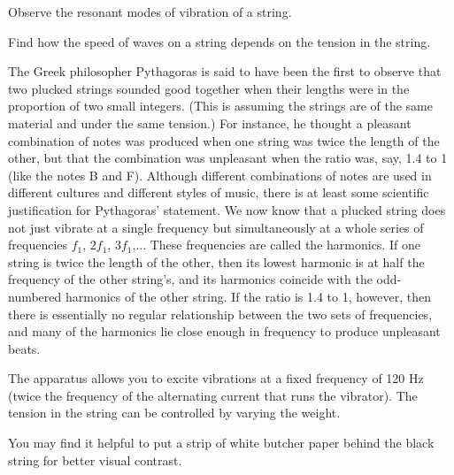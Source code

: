 \label{lab:standing-waves}

\apparatus
{}

\begin{goals}

\item[] Observe the resonant modes of vibration of a string.

\item[] Find how the speed of waves on a string depends on the
tension in the string.
\end{goals}

\introduction

The Greek philosopher Pythagoras is said to have been the
first to observe that two plucked strings sounded good
together when their lengths were in the proportion of two
small integers.  (This is assuming the strings are of the
same material and under the same tension.)  For instance, he
thought a pleasant combination of notes was produced when
one string was twice the length of the other, but that the
combination was unpleasant when the ratio was, say, 1.4 to 1
(like the notes B and F).  Although different combinations
of notes are used in different cultures and different styles
of music, there is at least some scientific justification
for Pythagoras' statement.  We now know that a plucked
string does not just vibrate at a single frequency but
simultaneously at a whole series of frequencies $f_1$,
$2f_1$, $3f_1$,...  These frequencies are called the
harmonics.  If one string is twice the length of the other,
then its lowest harmonic is at half the frequency of the
other string's, and its harmonics coincide with the
odd-numbered harmonics of the other string.  If the ratio is
1.4 to 1, however, then there is essentially no regular
relationship between the two sets of frequencies, and many
of the harmonics lie close enough in frequency to produce unpleasant beats.


\setup

The apparatus allows you to excite vibrations at a fixed
frequency of 120 Hz (twice the frequency of the alternating
current that runs the vibrator).  The tension in the string
can be controlled by varying the weight.

You may find it helpful to put a strip of white butcher paper
behind the black string for better visual contrast.

